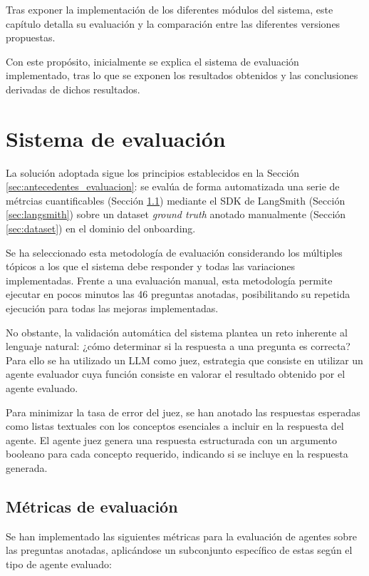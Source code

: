 Tras exponer la implementación de los diferentes módulos del sistema, este capítulo detalla su evaluación y la comparación entre las diferentes versiones propuestas.

Con este propósito, inicialmente se explica el sistema de evaluación implementado, tras lo que se exponen los resultados obtenidos y las conclusiones derivadas de dichos resultados. 

\section{Sistema de evaluación}
La solución adoptada sigue los principios establecidos en la Sección \ref{sec:antecedentes_evaluacion}: se evalúa de forma automatizada una serie de métrcias cuantificables (Sección \ref{sec:metricas}) mediante el SDK de LangSmith (Sección \ref{sec:langsmith}) sobre un dataset \textit{ground truth} anotado manualmente (Sección \ref{sec:dataset}) en el dominio del onboarding.

Se ha seleccionado esta metodología de evaluación considerando los múltiples tópicos a los que el sistema debe responder y todas las variaciones implementadas. Frente a una evaluación manual, esta metodología permite ejecutar en pocos minutos las 46 preguntas anotadas, posibilitando su repetida ejecución para todas las mejoras implementadas.

No obstante, la validación automática del sistema plantea un reto inherente al lenguaje natural: ¿cómo determinar si la respuesta a una pregunta es correcta? Para ello se ha utilizado un LLM como juez, estrategia que consiste en utilizar un agente evaluador cuya función consiste en valorar el resultado obtenido por el agente evaluado.

Para minimizar la tasa de error del juez, se han anotado las respuestas esperadas como listas textuales con los conceptos esenciales a incluir en la respuesta del agente. El agente juez genera una respuesta estructurada con un argumento booleano para cada concepto requerido, indicando si se incluye en la respuesta generada. 

\subsection{Métricas de evaluación}
\label{sec:metricas}
Se han implementado las siguientes métricas para la evaluación de agentes sobre las preguntas anotadas, aplicándose un subconjunto específico de estas según el tipo de agente evaluado:

